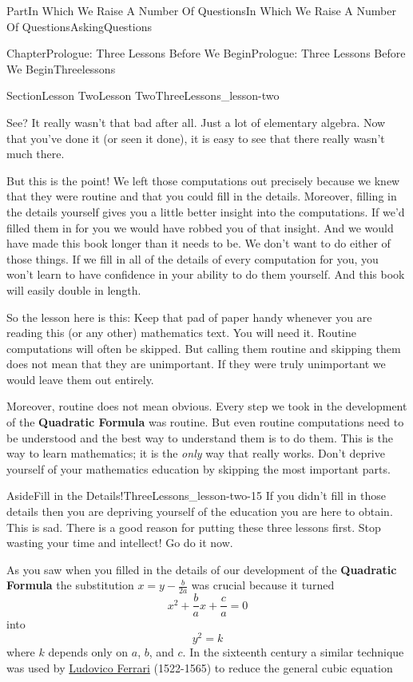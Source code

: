 \documentclass[oneside,10pt,]{book}
\newcommand{\terminology}[1]{\textbf{#1}}
\numberwithin{equation}{part}
\begin{document}
\begin{partptx}{Part}{In Which We Raise A Number Of Questions}{}{In Which We Raise A Number Of Questions}{}{}{AskingQuestions}
\begin{chapterptx}{Chapter}{Prologue: Three Lessons Before We Begin}{}{Prologue: Three Lessons Before We Begin}{}{}{Threelessons}
\begin{sectionptx}{Section}{Lesson Two}{}{Lesson Two}{}{}{ThreeLessons_lesson-two}
\par
See?  It really wasn't that bad after all.  Just a lot of elementary algebra.  Now that you've done it (or seen it done), it is easy to see that there really wasn't much there.%
\par
But this is the point!  We left those computations out precisely because we knew that they were routine and that you could fill in the details.  Moreover, filling in the details yourself gives you a little better insight into the computations.  If we'd filled them in for you we would have robbed you of that insight. And we would have made this book longer than it needs to be.  We don't want to do either of those things.  If we fill in all of the details of every computation for you, you won't learn to have confidence in your ability to do them yourself. And this book will easily double in length.%
\par
So the lesson here is this: Keep that pad of paper handy whenever you are reading this (or any other) mathematics text. You will need it.  Routine computations will often be skipped. But calling them routine and skipping them does not mean that they are unimportant.  If they were truly unimportant we would leave them out entirely.%
\par
Moreover, routine does not mean obvious. Every step we took in the development of the \terminology{Quadratic Formula} was routine. But even routine computations need to be understood and the best way to understand them is to do them. This is the way to learn mathematics; it is the \emph{only} way that really works.  Don't deprive yourself of your mathematics education by skipping the most important parts.%
\begin{aside}{Aside}{Fill in the Details!}{ThreeLessons_lesson-two-15}%
If you didn't fill in those details then you are depriving yourself of the education you are here to obtain. This is sad.  There is a good reason for putting these three lessons first.  Stop wasting your time and intellect! Go do it now.%
\end{aside}
As you saw when you filled in the details of our development of the \terminology{Quadratic Formula} the substitution \(x=y-\frac{b}{2a}\) was crucial because it turned%
\begin{equation*}
x^2+\frac{b}{a}x +\frac{c}{a}=0
\end{equation*}
into%
\begin{equation*}
y^2=k
\end{equation*}
where \(k\) depends only on \(a\), \(b\), and \(c\). In the sixteenth century a similar technique was used by \href{https://mathshistory.st-andrews.ac.uk/Biographies/Ferrari/}{Ludovico Ferrari} (1522-1565) to reduce the general cubic equation%

\end{sectionptx}
\end{chapterptx}
\end{partptx}
\end{document}
